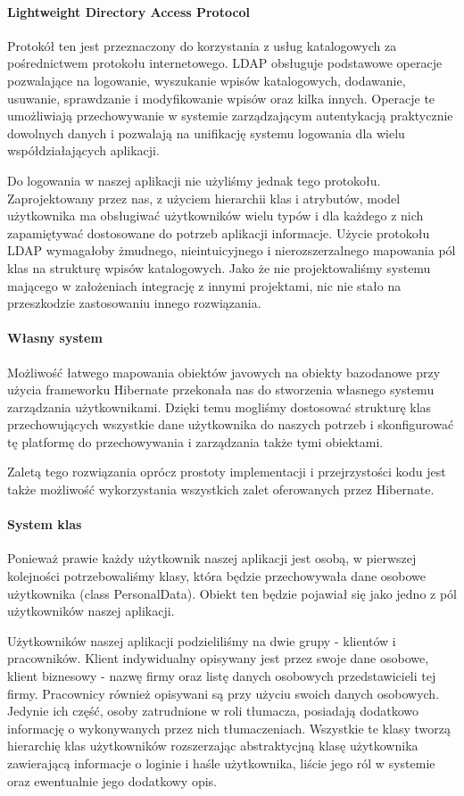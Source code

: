 \documentclass[licencjacka]{pracamgr}
\begin{document}
\paragraph{Lightweight Directory Access Protocol}
Protokół ten jest przeznaczony do korzystania z usług katalogowych za pośrednictwem protokołu internetowego. LDAP obsługuje podstawowe operacje pozwalające na logowanie, wyszukanie wpisów katalogowych, dodawanie, usuwanie, sprawdzanie i modyfikowanie wpisów oraz kilka innych. Operacje te umożliwiają przechowywanie w systemie zarządzającym autentykacją praktycznie dowolnych danych i pozwalają na unifikację systemu logowania dla wielu współdziałających aplikacji.

Do logowania w naszej aplikacji nie użyliśmy jednak tego protokołu. Zaprojektowany przez nas, z użyciem hierarchii klas i atrybutów, model użytkownika ma obsługiwać użytkowników wielu typów i dla każdego z nich zapamiętywać dostosowane do potrzeb aplikacji informacje. Użycie protokołu LDAP wymagałoby żmudnego, nieintuicyjnego i nierozszerzalnego mapowania pól klas na strukturę wpisów katalogowych. Jako że nie projektowaliśmy systemu mającego w założeniach integrację z innymi projektami, nic nie stało na przeszkodzie zastosowaniu innego rozwiązania.

\paragraph{Własny system}
Możliwość łatwego mapowania obiektów javowych na obiekty bazodanowe przy użycia frameworku Hibernate przekonała nas do stworzenia własnego systemu zarządzania użytkownikami. Dzięki temu mogliśmy dostosować strukturę klas przechowujących wszystkie dane użytkownika do naszych potrzeb i skonfigurować tę platformę do przechowywania i zarządzania także tymi obiektami.

Zaletą tego rozwiązania oprócz prostoty implementacji i przejrzystości kodu jest także możliwość wykorzystania wszystkich zalet oferowanych przez Hibernate.

\paragraph{System klas}
Ponieważ prawie każdy użytkownik naszej aplikacji jest osobą, w pierwszej kolejności potrzebowaliśmy klasy, która będzie przechowywała dane osobowe użytkownika (class PersonalData). Obiekt ten będzie pojawiał się jako jedno z pól użytkowników naszej aplikacji.

Użytkowników naszej aplikacji podzieliliśmy na dwie grupy - klientów i pracowników. Klient indywidualny opisywany jest przez swoje dane osobowe, klient biznesowy - nazwę firmy oraz listę danych osobowych przedstawicieli tej firmy. Pracownicy również opisywani są przy użyciu swoich danych osobowych. Jedynie ich część, osoby zatrudnione w roli tłumacza, posiadają dodatkowo informację o wykonywanych przez nich tłumaczeniach.
Wszystkie te klasy tworzą hierarchię klas użytkowników rozszerzając abstraktycjną klasę użytkownika zawierającą informacje o loginie i haśle użytkownika, liście jego ról w systemie oraz ewentualnie jego dodatkowy opis.
\end{document}
